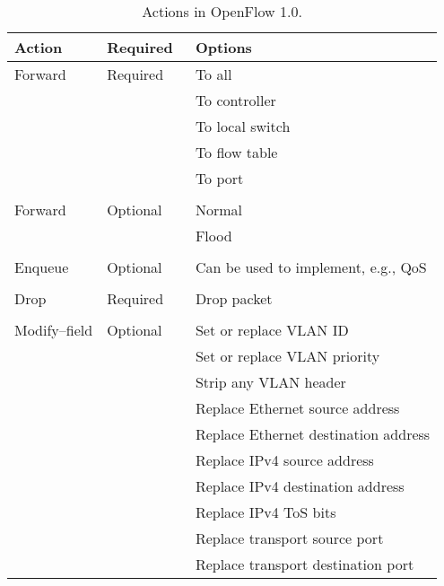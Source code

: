 \begin{table}
  \centering
  \begin{tabular}{lll}
    \hline
      \textbf{Action} &
      \textbf{Required} &
      \textbf{Options} \\

    \hline
      Forward &
      Required &
               To all \\
     & & To controller \\
     & & To local switch \\
     & & To flow table \\
     & & To port \\
    \\
      Forward &
      Optional &
               Normal \\
     & & Flood \\
    \\
      Enqueue &
      Optional &
      Can be used to implement, e.g., \acs{QoS} \\
    \\
      Drop &
      Required &
      Drop packet \\
    \\
      Modify--field &
      Optional &
               Set or replace VLAN ID \\
     & & Set or replace VLAN priority \\
     & & Strip any VLAN header \\
     & & Replace Ethernet source address \\
     & & Replace Ethernet destination address \\
     & & Replace IPv4 source address \\
     & & Replace IPv4 destination address \\
     & & Replace IPv4 \acs{ToS} bits \\
     & & Replace transport source port \\
     & & Replace transport destination port \\
    \hline
  \end{tabular}
  \caption{Actions in OpenFlow 1.0.}
  \label{table:openflow-1.0.actions}
\end{table}

